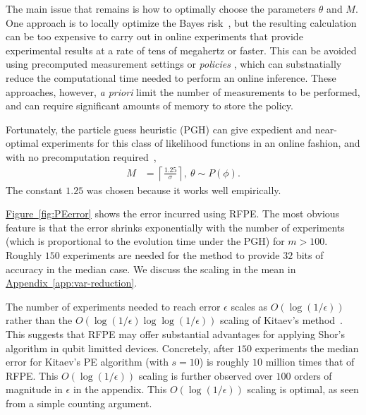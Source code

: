 \documentclass[aps,pra,amsmath,twocolumn,amssymb,superscriptaddress]{revtex4-1}
\newcommand{\app}[1]{\hyperref[app:#1]{Appendix~\ref*{app:#1}}}
\newcommand{\fig}[1]{\hyperref[fig:#1]{Figure~\ref*{fig:#1}}}
\newcommand{\ee}{\mathrm{e}}
\begin{document}
The main issue that remains is how to optimally choose the parameters $\theta$
and $M$. One approach is to locally optimize the Bayes
risk~\cite{granade_robust_2012}, but the resulting calculation can be too
expensive to carry out in online experiments that provide experimental results
at a rate of tens of megahertz or faster.
This can be avoided using precomputed
measurement settings
\cite{sergeevich_characterization_2011}
or \emph{policies} \cite{hentschel_machine_2010,hayes_swarm_2014}, which
can substnatially reduce the computational time needed to perform an online inference. These approaches,
however, \emph{a priori} limit the number of measurements to
be performed, and can require significant amounts of memory to store the policy.

Fortunately, the particle guess heuristic (PGH) can give
expedient and
near-optimal experiments for this class of likelihood
functions in an online fashion, and with no precomputation
required~\cite{wiebe_hamiltonian_2014},
\begin{align}
    M &= \left\lceil\frac{1.25}{\sigma}\right\rceil,~
    \theta \sim P(\phi).\label{eq:PGH}
\end{align}
The constant $1.25$ was chosen because it works well empirically.



\fig{PEerror} shows the error incurred using RFPE.  The most obvious feature is that the error shrinks exponentially with the number of experiments (which is proportional to the evolution time under the PGH) for $m>100$.  Roughly $150$ experiments are needed for the method to provide $32$ bits of accuracy in the median case.
We discuss the scaling in the mean in \app{var-reduction}.

The number of experiments needed to reach error $\epsilon$ scales as $O(\log(1/\epsilon))$ rather than the $O(\log(1/\epsilon)\log\log(1/\epsilon))$ scaling of Kitaev's method~\cite{Kit96,kitaev2002classical}.  
This suggests that RFPE may offer substantial advantages for applying Shor's algorithm in qubit limitted devices.
Concretely, after $150$ experiments the median error for Kitaev's PE algorithm (with $s=10$) is roughly $10$ million times that of RFPE.  This $O(\log(1/\epsilon))$ scaling  is further observed over $100$ orders of magnitude in $\epsilon$ in the appendix. This  $O(\log(1/\epsilon))$ scaling is optimal, as seen from a simple counting argument.


\end{document}
